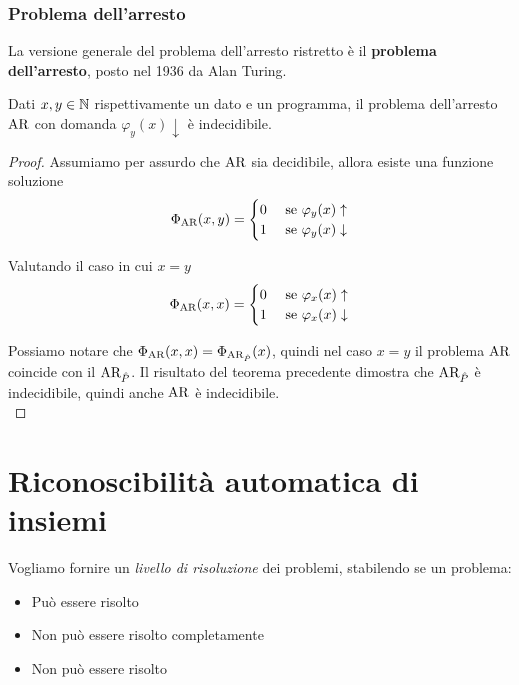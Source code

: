 \subsubsection{Problema dell'arresto}

La versione generale del problema dell'arresto ristretto è il \textbf{problema dell'arresto}, posto nel 1936 da Alan Turing.\\

\begin{theor}[Indecidibilità di $\ar$]
	Dati $x,y \in \mathbb{N}$ rispettivamente un dato e un programma, il problema dell'arresto $\ar$ con domanda $\varphi_y (x) \downarrow$ è indecidibile.
\end{theor}
\begin{proof}
	Assumiamo per assurdo che $\ar$ sia decidibile, allora esiste una funzione soluzione
	$$
	\Phi_{\text{AR}} (x,y) = \begin{cases}
		0 & \text{ se } \varphi_y (x) \uparrow \\
		1 & \text{ se } \varphi_y (x) \downarrow \\
	\end{cases}
	$$

	Valutando il caso in cui $x = y$
	$$
	\Phi_{\text{AR}} (x,x) = \begin{cases}
		0 & \text{ se } \varphi_x (x) \uparrow \\
		1 & \text{ se } \varphi_x (x) \downarrow \\
	\end{cases}
	$$

	Possiamo notare che $\Phi_{\text{AR}} (x,x) = \Phi_{\text{AR}_{\hat{P}}} (x)$, quindi nel caso $x = y$ il problema $\ar$ coincide con il $\text{AR}_{\hat{P}}$. Il risultato del teorema precedente dimostra che $\text{AR}_{\hat{P}}$ è indecidibile, quindi anche $\ar$ è indecidibile.\\
\end{proof}

\section{Riconoscibilità automatica di insiemi}

Vogliamo fornire un \textit{livello di risoluzione} dei problemi, stabilendo se un problema:
\begin{itemize}
	\item Può essere risolto
    
	\item Non può essere risolto completamente
	
    \item Non può essere risolto
\end{itemize}

